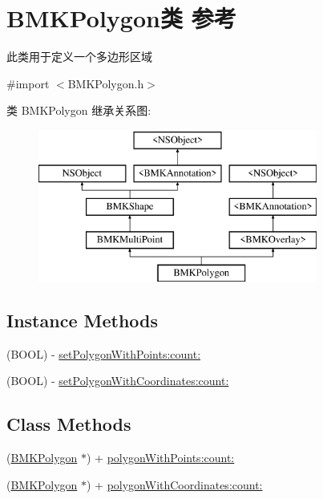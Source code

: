 \hypertarget{interface_b_m_k_polygon}{}\section{B\+M\+K\+Polygon类 参考}
\label{interface_b_m_k_polygon}


此类用于定义一个多边形区域  




{\ttfamily \#import $<$B\+M\+K\+Polygon.\+h$>$}

类 B\+M\+K\+Polygon 继承关系图\+:\begin{figure}[H]
\begin{center}
\leavevmode
\includegraphics[height=5.000000cm]{interface_b_m_k_polygon}
\end{center}
\end{figure}
\subsection*{Instance Methods}
\begin{DoxyCompactItemize}
\item 
(B\+O\+O\+L) -\/ \hyperlink{interface_b_m_k_polygon_af87d11367261e169ee14d3e50742d902}{set\+Polygon\+With\+Points\+:count\+:}
\item 
(B\+O\+O\+L) -\/ \hyperlink{interface_b_m_k_polygon_a54b1ab0374d2083ddeabe8d9b7ac4b77}{set\+Polygon\+With\+Coordinates\+:count\+:}
\end{DoxyCompactItemize}
\subsection*{Class Methods}
\begin{DoxyCompactItemize}
\item 
(\hyperlink{interface_b_m_k_polygon}{B\+M\+K\+Polygon} $\ast$) + \hyperlink{interface_b_m_k_polygon_a74b92a200709fb4c6718b26ebdfcc50a}{polygon\+With\+Points\+:count\+:}
\item 
(\hyperlink{interface_b_m_k_polygon}{B\+M\+K\+Polygon} $\ast$) + \hyperlink{interface_b_m_k_polygon_aa3de0deeba040969c9211b64c59831f2}{polygon\+With\+Coordinates\+:count\+:}
\end{DoxyCompactItemize}
